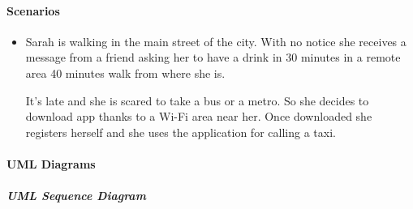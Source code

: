 \paragraph{Scenarios}
\begin{itemize}
	\item Sarah is walking in the main street of the city. With no notice she receives a message from a friend asking her to have a drink in 30 minutes in a remote area 40 minutes walk from where she is.\par It's late and she is scared to take a bus or a metro. So she decides to download \myTaxiService{} app thanks to a Wi-Fi area near her. Once downloaded she registers herself and she uses the application for calling a taxi.
\end{itemize}
\paragraph{UML Diagrams}
\subparagraph{UML Sequence Diagram}
